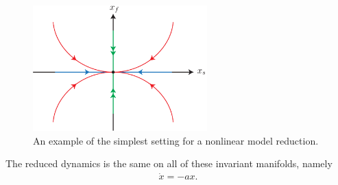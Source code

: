 \begin{figure}[h!]
	\centering
	\includegraphics[width=0.6\textwidth]{figures/ch9/29simplestReduction.pdf}
	\caption{An example of the simplest setting for a nonlinear model reduction.}
	\label{fig:simplestReduction}
\end{figure}

The reduced dynamics is the same on all of these invariant manifolds, namely
\begin{align}
	\dot{x} = -ax.
\end{align}

